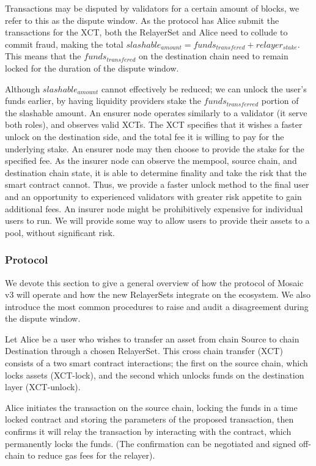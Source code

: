 Transactions may be disputed by validators for a certain amount of blocks, we refer to this as the dispute window. As the protocol has Alice submit the transactions for the XCT, both the RelayerSet and Alice need to collude to commit fraud, making the total $slashable_{amount} = funds_{transfered} + relayer_{stake}$. This means that the $funds_{transfered}$ on the destination chain need to remain locked for the duration of the dispute window.

Although $slashable_{amount}$ cannot effectively be reduced; we can unlock the user’s funds earlier, by having liquidity providers stake the $funds_{transferred}$ portion of the slashable amount. An ensurer node operates similarly to a validator (it serve both roles), and observes valid XCTs. The XCT specifies that it wishes a faster unlock on the destination side, and the total fee it is willing to pay for the underlying stake. An ensurer node may then choose to provide the stake for the specified fee. As the insurer node can observe the mempool, source chain, and destination chain state, it is able to determine finality and take the risk that the smart contract cannot. Thus, we provide a faster unlock method to the final user and an opportunity to experienced validators with greater risk appetite to gain additional fees.  An insurer node might be prohibitively expensive for individual users to run. We will provide some way to allow users to provide their assets to a pool, without significant risk.

\subsubsection{Protocol}
We devote this section to give a general overview of how the protocol of Mosaic v3 will operate and how the new RelayerSets integrate on the ecosystem. We also introduce the most common procedures to raise and audit a disagreement during the dispute window.

Let Alice be a user who wishes to transfer an asset from chain Source to chain Destination through a chosen RelayerSet. This cross chain transfer (XCT) consists of a two smart contract interactions; the first on the source chain, which locks assets (XCT-lock), and the second which unlocks funds on the destination layer (XCT-unlock).

Alice initiates the transaction on the source chain, locking the funds in a time locked contract and storing the parameters of the proposed transaction,  then confirms it will relay the transaction by interacting with the contract, which permanently locks the funds. (The confirmation can be negotiated and signed off-chain to reduce gas fees for the relayer).

